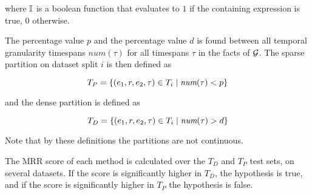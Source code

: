 \noindent
where $\mathbb{I}$ is a boolean function that evaluates to $1$ if the containing expression is true, $0$ otherwise.

The  percentage value $p$ and the  percentage value $d$ is found between all temporal granularity timespans $\mathit{num}(\tau)$ for all timespans $\tau$ in the facts of $\mathcal{G}$. The sparse partition on dataset split $i$ is then defined as

\begin{equation}
T_P = \{ (e_1, r, e_2, \tau) \in T_i \mid \textit{num}(\tau) < p \}
\end{equation}

\noindent
and the dense partition is defined as 

\begin{equation}
T_D = \{ (e_1, r, e_2, \tau) \in T_i \mid \textit{num}(\tau) > d \}
\end{equation}

Note that by these definitions the partitions are not continuous.

The MRR score of each method is calculated over the $T_D$ and $T_P$ test sets, on several datasets. If the score is significantly higher in $T_D$, the hypothesis is true, and if the score is significantly higher in $T_P$ the hypothesis is false.

\begin{comment}
foreach fact in dataset
    fact_count_i_timespan(fact) >> array
done
sort(array)
median(array)
\end{comment}